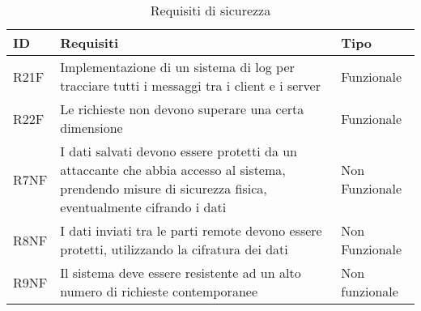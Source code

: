 \begin{table}[htbp]
    \centering
    \begin{tabular} {|P{1.3cm}|P{11.2cm}|P{3cm}|}
        \hline
        \textbf{ID}                       & \textbf{Requisiti}                                                  & \textbf{Tipo} \\
        \hline
        R21F                              & Implementazione di un sistema di log per tracciare tutti i messaggi
        tra i client e i server           & Funzionale                                                                          \\
        \hline
        R22F                              & Le richieste non devono superare una certa dimensione               & Funzionale    \\
        \hline
        R7NF                              & I dati salvati devono essere protetti da un attaccante che abbia
        accesso al sistema, prendendo misure di sicurezza fisica, eventualmente
        cifrando i dati                   & Non Funzionale                                                                      \\
        \hline
        R8NF                              & I dati inviati tra le parti remote devono essere protetti, utilizzando la cifratura dei dati & Non Funzionale                                                                      \\
        \hline
        R9NF & Il sistema deve essere resistente ad un alto numero di richieste contemporanee & Non funzionale  \\
        \hline
    \end{tabular}
    \caption{Requisiti di sicurezza}
\end{table}

\clearpage